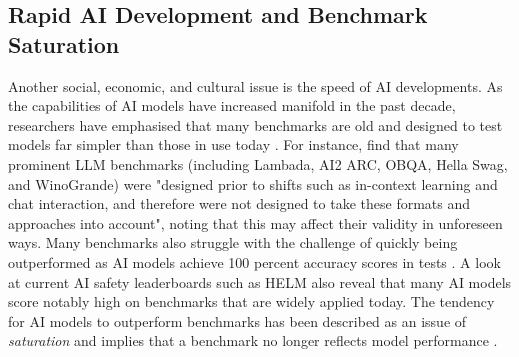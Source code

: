 \subsection{Rapid AI Development and Benchmark Saturation}

Another social, economic, and cultural issue is the speed of AI developments. As the capabilities of AI models have increased manifold in the past decade, researchers have emphasised that many benchmarks are old and designed to test models far simpler than those in use today \cite{keegan2024, biderman2024}. For instance, \citet[p.~5]{biderman2024} find that many prominent LLM benchmarks (including Lambada, AI2 ARC, OBQA, Hella Swag, and WinoGrande) were "designed prior to shifts such as in-context learning and chat interaction, and therefore were not designed to take these formats and approaches into account", noting that this may affect their validity in unforeseen ways. 
Many benchmarks also struggle with the challenge of quickly being outperformed as AI models achieve 100 percent accuracy scores in tests \cite{hendrycks2021, bowman2021}. A look at current AI safety leaderboards such as HELM also reveal that many AI models score notably high on benchmarks that are widely applied today. The tendency for AI models to outperform benchmarks has been described as an issue of \textit{saturation} and implies that a benchmark no longer reflects model performance \cite{ott2022}. 

